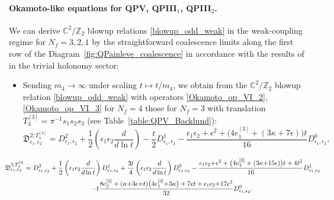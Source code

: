 \documentclass[12pt,a4paper]{article}
\numberwithin{equation}{section}
\begin{document}
\paragraph{Okamoto-like equations for QPV, QPIII$_1$, QPIII$_2$.}
We can derive $\mathbb{C}^2/\mathbb{Z}_2$ blowup relations \eqref{blowup_odd_weak} in the weak-coupling regime for $N_f=3,2,1$ by the straightforward coalescence limits along the first row of the Diagram~\ref{fig:QPainleve_coalescence} in accordance with the results of \cite[Sec. 3.1, 3.3]{BST25} in the trivial holonomy sector:
\begin{itemize}
\item
Sending $m_4\rightarrow\infty$ under scaling $t\mapsto t/m_4$, we obtain from the $\mathbb{C}^2/\mathbb{Z}_2$ blowup relation \eqref{blowup_odd_weak} with operators \eqref{Okamoto_op_VI_2}, \eqref{Okamoto_op_VI_3} for $N_f=4$ those for $N_f=3$ with translation $T_3^{[3]}=\pi^{-1}s_1s_2s_3$ (see Table~\ref{table:QPV_Backlund}): 
\begin{equation}\label{Okamoto_op_V_2}
\mathfrak{D}^{2;T_3^{[3]}}_{\epsilon_1,\epsilon_2}=D^2_{\epsilon_1,\epsilon_2}+\frac12\left(\epsilon_1\epsilon_2\frac{d}{d\ln t}\right)-\frac{t}2 D^1_{\epsilon_1,\epsilon_2}-\frac{\epsilon_1\epsilon_2{+}\epsilon^2+\big(4e_1^{[3]}+(3\kappa{+}7\epsilon)\big)t}{16}D^0_{\epsilon_1,\epsilon_2},
\end{equation}

\vspace{-0.7cm}

\begin{multline}\label{Okamoto_op_V_3}
\mspace{-50mu}\mathfrak{D}^{3;T_3^{[3]}}_{\epsilon_1,\epsilon_2}=D^3_{\epsilon_1,\epsilon_2}+\frac12\left(\epsilon_1\epsilon_2\frac{d}{d\ln t}\right)D^1_{\epsilon_1,\epsilon_2}+\frac{3t}4\left(\epsilon_1\epsilon_2\frac{d}{d\ln t}\right)D^0_{\epsilon_1,\epsilon_2}
-\frac{\epsilon_1\epsilon_2{+}\epsilon^2+\big(4e_1^{[3]}+(3\kappa{+}15\epsilon)\big)t+4t^2}{16}D^1_{\epsilon_1,\epsilon_2}\\
-t\frac{8e_2^{[3]}+(\kappa{+}3\epsilon{+}t)\big(4e_1^{[3]}{+}3\kappa\big)+7\epsilon t+\epsilon_1\epsilon_2{+}17\epsilon^2}{32}D^0_{\epsilon_1,\epsilon_2}.
\end{multline}


\end{itemize}
\end{document}
